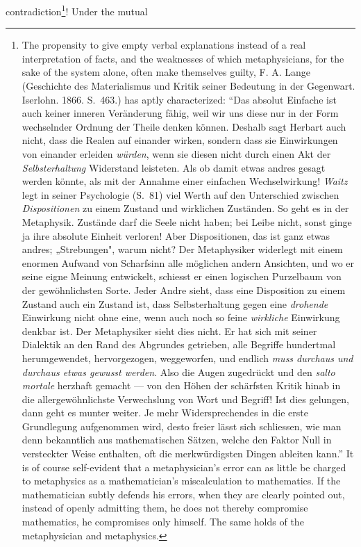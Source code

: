 \documentclass[12pt]{article}
\begin{document}
contradiction\footnote{The propensity to give empty verbal explanations
instead of a real interpretation of facts, and the weaknesses of which
metaphysicians, for the sake of the system alone, often make themselves
guilty, F. A. Lange (Geschichte des Materialismus und Kritik seiner
Bedeutung in der Gegenwart. Iserlohn. 1866. S.\ 463.) has aptly
characterized: ``Das absolut Einfache ist auch keiner inneren Veränderung
fähig, weil wir uns diese nur in der Form wechselnder Ordnung der Theile
denken können. Deshalb sagt Herbart auch nicht, dass die Realen auf einander
wirken, sondern dass sie Einwirkungen von einander erleiden \emph{würden},
wenn sie diesen nicht durch einen Akt der \emph{Selbsterhaltung} Widerstand
leisteten. Als ob damit etwas andres gesagt werden könnte, als mit der
Annahme einer einfachen Wechselwirkung! \emph{Waitz} legt in seiner
Psychologie (S.\ 81) viel Werth auf den Unterschied zwischen
\emph{Dispositionen} zu einem Zustand und wirklichen Zuständen. So geht es in
der Metaphysik. Zustände darf die Seele nicht haben; bei Leibe nicht, sonst
ginge ja ihre absolute Einheit verloren! Aber Dispositionen, das ist ganz
etwas andres; „Strebungen", warum nicht? Der Metaphysiker widerlegt mit
einem enormen Aufwand von Scharfsinn alle möglichen andern Ansichten, und wo
er seine eigne Meinung entwickelt, schiesst er einen logischen Purzelbaum von
der gewöhnlichsten Sorte. Jeder Andre sieht, dass eine Disposition zu einem
Zustand auch ein Zustand ist, dass Selbsterhaltung gegen eine
\emph{drohende} Einwirkung nicht ohne eine, wenn auch noch so feine
\emph{wirkliche} Einwirkung denkbar ist. Der Metaphysiker sieht dies nicht.
Er hat sich mit seiner Dialektik an den Rand des Abgrundes getrieben, alle
Begriffe hundertmal herumgewendet, hervorgezogen, weggeworfen, und endlich
\emph{muss durchaus und durchaus etwas gewusst werden}. Also die Augen
zugedrückt und den \emph{salto mortale} herzhaft gemacht --- von den Höhen
der schärfsten Kritik hinab in die allergewöhnlichste Verwechslung von Wort
und Begriff! Ist dies gelungen, dann geht es munter weiter. Je mehr
Widersprechendes in die erste Grundlegung aufgenommen wird, desto freier
lässt sich schliessen, wie man denn bekanntlich aus mathematischen Sätzen,
welche den Faktor Null in versteckter Weise enthalten, oft die merkwürdigsten
Dingen ableiten kann.'' It is of course self-evident that a metaphysician's
error can as little be charged to metaphysics as a mathematician's
miscalculation to mathematics. If the mathematician subtly defends his
errors, when they are clearly pointed out, instead of openly admitting them,
he does not thereby compromise mathematics, he compromises only himself. The
same holds of the metaphysician and metaphysics.}! Under the mutual
\end{document}
